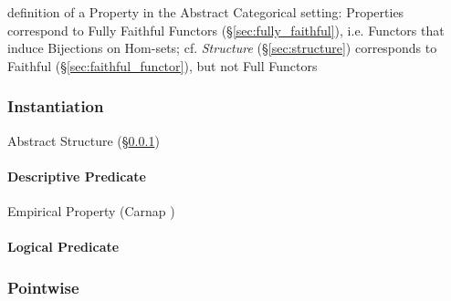 definition of a Property in the Abstract Categorical setting: Properties
correspond to Fully Faithful Functors (\S\ref{sec:fully_faithful}), i.e.
Functors that induce Bijections on Hom-sets; cf. \emph{Structure}
(\S\ref{sec:structure}) corresponds to Faithful (\S\ref{sec:faithful_functor}),
but not Full Functors



\subsubsection{Instantiation}\label{sec:instantiation}

Abstract Structure (\S\ref{sec:instantiation})



\paragraph{Descriptive Predicate}\label{sec:descriptive_predicate}\hfill

Empirical Property (Carnap \cite{carnap59})



\paragraph{Logical Predicate}\label{sec:logical_predicate}\hfill



\subsubsection{Pointwise}\label{sec:pointwise}
